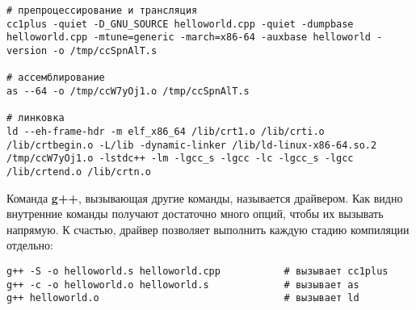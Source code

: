\begin{verbatim}
# препроцессирование и трансляция
cc1plus -quiet -D_GNU_SOURCE helloworld.cpp -quiet -dumpbase helloworld.cpp -mtune=generic -march=x86-64 -auxbase helloworld -version -o /tmp/ccSpnAlT.s

# ассемблирование
as --64 -o /tmp/ccW7yOj1.o /tmp/ccSpnAlT.s

# линковка
ld --eh-frame-hdr -m elf_x86_64 /lib/crt1.o /lib/crti.o /lib/crtbegin.o -L/lib -dynamic-linker /lib/ld-linux-x86-64.so.2 /tmp/ccW7yOj1.o -lstdc++ -lm -lgcc_s -lgcc -lc -lgcc_s -lgcc /lib/crtend.o /lib/crtn.o
\end{verbatim}

Команда {\bf g++}, вызывающая другие команды, называется драйвером. Как видно внутренние команды получают достаточно много опций, чтобы их вызывать напрямую. К счастью, драйвер позволяет выполнить каждую стадию компиляции отдельно:

\begin{verbatim}
g++ -S -o helloworld.s helloworld.cpp           # вызывает cc1plus
g++ -c -o helloworld.o helloworld.s             # вызывает as
g++ helloworld.o                                # вызывает ld
\end{verbatim}
